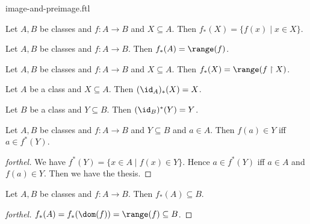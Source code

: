 \documentclass{naproche-library}
\begin{document}
\begin{smodule}[title=Computation Laws for Images and Preimages]{image-and-preimage.ftl}

\begin{proposition}[forthel,id=FOUNDATIONS_07_5919649206108160]
  Let $A, B$ be classes and $f : A \to B$ and $X \subseteq A$.
  Then $f_{*}(X) = \{ f(x) \mid x \in X \}$.
\end{proposition}

\begin{corollary}[forthel,id=FOUNDATIONS_07_5543924730953728]
  Let $A, B$ be classes and $f : A \to B$.
  Then $f_{*}(A) = \range(f)$.
\end{corollary}

\begin{corollary}[forthel,id=FOUNDATIONS_07_1818812171157504]
  Let $A, B$ be classes and $f : A \to B$ and $X \subseteq A$.
  Then $f_{*}(X) = \range(f \restriction X)$.
\end{corollary}

\begin{proposition}[forthel,id=FOUNDATIONS_07_911395830890496]
  Let $A$ be a class and $X \subseteq A$.
  Then $(\id_{A})_{*}(X) = X$.
\end{proposition}

\begin{proposition}[forthel,id=FOUNDATIONS_07_3349817830932480]
  Let $B$ be a class and $Y \subseteq B$.
  Then $(\id_{B})^{*}(Y) = Y$.
\end{proposition}

\begin{proposition}[forthel,id=FOUNDATIONS_07_6362984433582080]
  Let $A, B$ be classes and $f : A \to B$ and $Y \subseteq B$ and $a \in A$.
  Then $f(a) \in Y$ iff $a \in f^{*}(Y)$.
\end{proposition}
\begin{proof}[forthel]
  We have $f^{*}(Y) = \{ x \in A \mid f(x) \in Y \}$.
  Hence $a \in f^{*}(Y)$ iff $a \in A$ and $f(a) \in Y$.
  Then we have the thesis.
\end{proof}

\begin{proposition}[forthel,id=FOUNDATIONS_07_6730546254184448]
  Let $A, B$ be classes and $f : A \to B$.
  Then $f_{*}(A) \subseteq B$.
\end{proposition}
\begin{proof}[forthel]
  $f_{*}(A)
    = f_{*}(\dom(f))
    = \range(f)
    \subseteq B$.
\end{proof}


\end{smodule}
\end{document}
